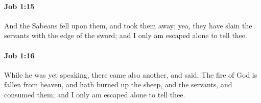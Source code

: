 		\paragraph{Job 1:15} %
			\label{JOB-1-15}

			And the Sabeans fell upon them, and took them away; yea, they have slain the servants with the edge of the sword; and I only am escaped alone to tell thee.


		\paragraph{Job 1:16} %
			\label{JOB-1-16}

			While he was yet speaking, there came also another, and said, The fire of God is fallen from heaven, and hath burned up the sheep, and the servants, and consumed them; and I only am escaped alone to tell thee.


